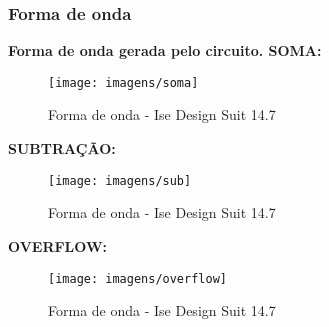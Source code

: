 \documentclass[12pts]{article}
\begin{document}


\newpage
\subsubsection{Forma de onda}

\textbf{Forma de onda gerada pelo circuito. SOMA:}

\begin{figure}[!htb]
  \centering
  \texttt{[image: imagens/soma]}
  \caption{Forma de onda - Ise Design Suit 14.7}
  \label{figRotulo}
\end{figure}

\newpage
\textbf{SUBTRAÇÃO:}
\begin{figure}[!htb]
  \centering
  \texttt{[image: imagens/sub]}
  \caption{Forma de onda - Ise Design Suit 14.7}
  \label{figRotulo}
\end{figure}

\newpage
\textbf{OVERFLOW:}
\begin{figure}[!htb]
  \centering
  \texttt{[image: imagens/overflow]}
  \caption{Forma de onda - Ise Design Suit 14.7}
  \label{figRotulo}
\end{figure}
\end{document}

